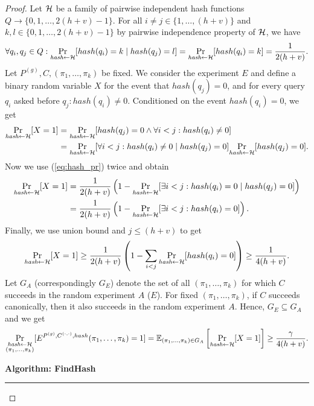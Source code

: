 %
\begin{proof}
Let $\mathcal{H}$ be a family of pairwise independent hash functions $Q \rightarrow \{0,1, \dots,2(h+v)-1\}$.
For all $i \neq j \in \{1, \dots, (h+v)\}$ and $k,l \in \{0,1,\dots,2(h+v)-1\}$ by pairwise independence property of $\mathcal{H}$,
we have
\begin{align}
  \label{eq:hash_pr}
 \forall q_i,q_j \in Q : \underset{\textit{hash} \leftarrow \mathcal{H}}{\Pr}[hash(q_i) = k \mid hash(q_j) = l] = \underset{\textit{hash} \leftarrow \mathcal{H}}{\Pr}[hash(q_i) = k] = \frac{1}{2(h+v)}.
\end{align}
Let $P^{(g)}, C, (\pi_1, \dots, \pi_k)$ be fixed. We consider the experiment $E$ and define a binary random variable $X$ for the event that $hash(q_j) = 0$, and for
every query $q_i$ asked before $q_j : hash(q_i) \neq 0$.
Conditioned on the event $hash(q_i) = 0$, we get
\begin{align*}
  \underset{\textit{hash} \leftarrow \mathcal{H}}{\Pr}[X=1] &= \underset{\textit{hash} \leftarrow \mathcal{H}}{\Pr}[hash(q_j) = 0 \land \forall i < j : hash(q_i) \neq 0] \\
  &=\underset{\textit{hash} \leftarrow \mathcal{H}}{\Pr}[\forall i < j : hash(q_i) \neq 0 \mid hash(q_j) = 0] \underset{\textit{hash} \leftarrow \mathcal{H}}{\Pr}[hash(q_j) = 0].
\end{align*}
Now we use (\ref{eq:hash_pr}) twice and obtain
\begin{align*}
\underset{\textit{hash} \leftarrow \mathcal{H}}{\Pr}[X=1] &=
\frac{1}{2(h+v)}\left(1 -\underset{\textit{hash} \leftarrow \mathcal{H}}{\Pr}[\exists i < j : hash(q_i) = 0 \mid hash(q_j) = 0] \right) \\
 &= \frac{1}{2(h+v)} \left( 1 -\underset{\textit{hash} \leftarrow \mathcal{H}}{\Pr}[\exists i < j : hash(q_i) = 0] \right).
\end{align*}
Finally, we use union bound and $j \leq (h+v)$ to get
\begin{align*}
\underset{\textit{hash} \leftarrow \mathcal{H}}{\Pr}[X=1] \geq
\frac{1}{2(h+v)} \left( 1 - \sum_{i < j} \underset{\textit{hash} \leftarrow \mathcal{H}}{\Pr}[hash(q_i) = 0] \right) \geq \frac{1}{4(h+v)}.
\end{align*}
Let $G_A$ (correspondingly $G_E$) denote the set of all $(\pi_1, \dots, \pi_k)$ for which $C$ succeeds in the random experiment $A$ ($E$).
For fixed $(\pi_1, \dots, \pi_k)$, if $C$ succeeds canonically, then it also succeeds in the random experiment $A$.
Hence, $G_E \subseteq G_A$ and we get
\begin{align}
  \label{ineq:hash_high_prob}
\underset{\substack{\textit{hash} \leftarrow \mathcal{H} \\ (\pi_1, \dots, \pi_k)}}{\Pr}[E^{P^{(g)}, C^{(\cdot, \cdot)}, hash}(\pi_1, \dots, \pi_k) = 1] =
\mathbb{E}_{(\pi_1, \dots, \pi_k) \in G_A}\left[\underset{\substack{\textit{hash} \leftarrow \mathcal{H}}}{\Pr}[X = 1]\right]
\geq \frac{\gamma}{4(h+v)}.
\end{align}
%
\begin{codeblock}
  \textbf{Algorithm: FindHash}
  \medskip
  \hrule
  \medskip


\end{codeblock}
\end{proof}
